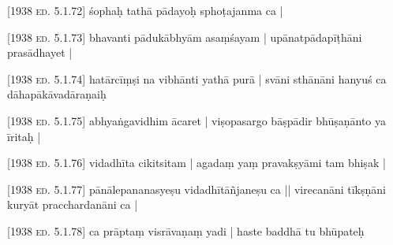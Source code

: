 \documentclass[14pt]{book}
\newcommand*{\caesura}{\linebreak}
\begin{document}
 
\pstart
{}
\pend

 
\pstart

                         \textsc{[1938 ed. 5.1.72]}
                        \caesura śophaḥ  tathā  pādayoḥ sphoṭajanma ca | 
\pend

 
\pstart

                         \textsc{[1938 ed. 5.1.73]}
                        \caesura bhavanti  pādukābhyām asaṃśayam | \caesura upānatpādapīṭhāni  prasādhayet | 
\pend

 
\pstart

                         \textsc{[1938 ed. 5.1.74]}
                        \caesura {} hatārcīṃṣi na vibhānti yathā purā | \caesura svāni sthānāni hanyuś ca dāhapākāvadāraṇaiḥ 
\pend

 
\pstart

                         \textsc{[1938 ed. 5.1.75]}
                        \caesura {} abhyaṅgavidhim ācaret | \caesura viṣopasargo bāṣpādir bhūṣaṇānto ya īritaḥ | 
\pend

 
\pstart

                         \textsc{[1938 ed. 5.1.76]}
                        \caesura {}   vidadhīta cikitsitam | \caesura {} agadaṃ yaṃ pravakṣyāmi tam bhiṣak | 
\pend

 
\pstart

                         \textsc{[1938 ed. 5.1.77]}
                        \caesura pānālepananasyeṣu vidadhītāñjaneṣu ca || \caesura virecanāni tīkṣṇāni kuryāt pracchardanāni ca | 
\pend

 
\pstart

                         \textsc{[1938 ed. 5.1.78]}
                        \caesura {} ca   prāptaṃ visrāvaṇaṃ yadi | \caesura {}  haste baddhā tu bhūpateḥ 
\pend
\end{document}

